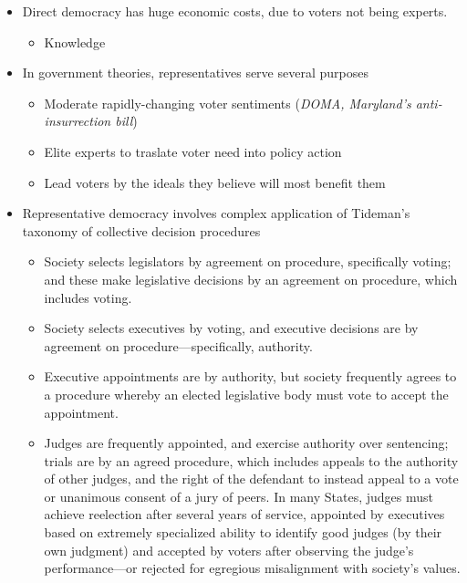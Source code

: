 \begin{itemize}
    \item Direct democracy has huge economic costs, due to voters not being experts.
    \begin{itemize}
        \item Knowledge \autocite[p.57]{Tideman2006}
    \end{itemize}

    \item In government theories, representatives serve several purposes
    \begin{itemize}
        \item Moderate rapidly-changing voter sentiments (\emph{DOMA, Maryland's anti-insurrection bill})

        \item Elite experts to traslate voter need into policy action

        \item Lead voters by the ideals they believe will most benefit them
    \end{itemize}

    \item Representative democracy involves complex application of Tideman's taxonomy of collective decision procedures
    \begin{itemize}
        \item Society selects legislators by agreement on procedure, specifically voting; and these make legislative decisions by an agreement on procedure, which includes voting.

        \item Society selects executives by voting, and executive decisions are by agreement on procedure—specifically, authority.

        \item Executive appointments are by authority, but society frequently agrees to a procedure whereby an elected legislative body must vote to accept the appointment.

        \item Judges are frequently appointed, and exercise authority over sentencing; trials are by an agreed procedure, which includes appeals to the authority of other judges, and the right of the defendant to instead appeal to a vote or unanimous consent of a jury of peers.  In many States, judges must achieve reelection after several years of service, appointed by executives based on extremely specialized ability to identify good judges (by their own judgment) and accepted by voters after observing the judge's performance—or rejected for egregious misalignment with society's values.


\end{itemize}
\end{itemize}
